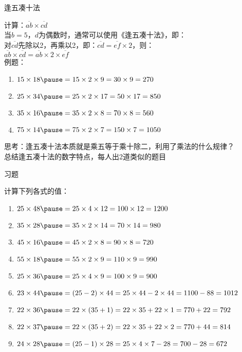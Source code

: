\documentclass[aspectratio=169]{ctexbeamer} %
\date{\today}
\begin{document}
\begin{frame}[t]{逢五凑十法}
\begin{spacing}{1.2}
\normalsize
计算：$\overline{ab} \times \overline{cd}$ \\
当$b = 5$，$d$为偶数时，通常可以使用《逢五凑十法》，即：\\
对$\overline{cd}$先除以2，再乘以2，即：$\overline{cd} = \overline{ef} \times 2$，则：\\
$\overline{ab} \times \overline{cd} = \overline{ab} \times 2 \times \overline{ef} $ \\
例题：
\begin{enumerate}[label={\arabic*.}]
\item $15 \times 18 \pause = 15 \times 2 \times 9=30 \times 9 = 270$
\item $25 \times 34 \pause = 25 \times 2 \times 17=50 \times 17 = 850$
\item $35 \times 16 \pause = 35 \times 2 \times 8=70 \times 8 = 560$
\item $75 \times 14 \pause = 75 \times 2 \times 7=150 \times 7 = 1050$
\end{enumerate}
\alert{思考：逢五凑十法本质就是乘五等于乘十除二，利用了乘法的什么规律？} \\
\alert{总结逢五凑十法的数字特点，每人出2道类似的题目} \\
\end{spacing}
\end{frame}

\begin{frame}[t]{习题}
\begin{spacing}{1.2}
\normalsize
计算下列各式的值：
\begin{enumerate}[label={\arabic*.}]
\item $25 \times 48 \pause = 25 \times 4 \times 12 = 100 \times 12 = 1200$
\item $35 \times 28 \pause = 35 \times 2 \times 14 = 70 \times 14 = 980$
\item $45 \times 16 \pause = 45 \times 2 \times 8 = 90 \times 8 = 720$
\item $55 \times 18 \pause = 55 \times 2 \times 9 = 110 \times 9 = 990$
\item $25 \times 36 \pause = 25 \times 4 \times 9 = 100 \times 9 = 900$
\item $23 \times 44 \pause = (25 - 2) \times 44 = 25 \times 44 - 2 \times 44 = 1100 - 88 = 1012$
\item $22 \times 36 \pause = 22 \times (35+1) = 22 \times 35 + 22 \times 1 = 770 + 22 = 792$
\item $22 \times 37 \pause = 22 \times (35+2) = 22 \times 35 + 22 \times 2 = 770 + 44 = 814$
\item $24 \times 28 \pause = (25-1) \times 28 = 25 \times 4 \times 7 - 28 = 700 - 28 = 672$
\end{enumerate}

\end{spacing}
\end{frame}
\end{document}

